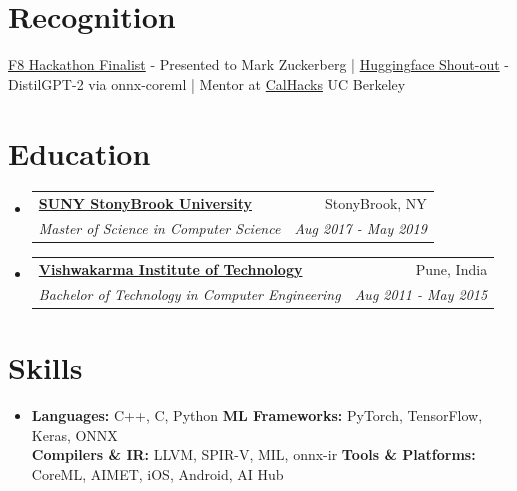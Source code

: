 \documentclass[letterpaper,10pt]{article}
\makeatletter
\newcommand{\resumeSubheading}[4]{
  \vspace{-1pt}\item
    \begin{tabular*}{0.97\textwidth}{l@{\extracolsep{\fill}}r}
      \textbf{#1} & #2 \\
      \textit{\small#3} & \textit{\small #4} \\
    \end{tabular*}\vspace{-5pt}
}
\newcommand{\resumeSubHeadingListStart}{\begin{itemize}[leftmargin=*]}
\newcommand{\resumeSubHeadingListEnd}{\end{itemize}}
\makeatother
\begin{document}
\section{Recognition}
\vspace{-2pt}
\footnotesize
\href{https://devpost.com/software/opencurriculum-by-wattba}{F8 Hackathon Finalist} - Presented to Mark Zuckerberg |
\href{https://x.com/julien_c/status/1181629761761755137}{Huggingface Shout-out} - DistilGPT-2 via onnx-coreml |
Mentor at \href{https://calhacks.io/}{CalHacks} UC Berkeley
\normalsize

\section{Education}
\resumeSubHeadingListStart
    \resumeSubheading
      {\href{http://www.stonybrook.edu/}{SUNY StonyBrook University}}{StonyBrook, NY}
      {Master of Science in Computer Science}{Aug 2017 - May 2019}
    \resumeSubheading
      {\href{http://vit.edu/}{Vishwakarma Institute of Technology}}{Pune, India}
      {Bachelor of Technology in Computer Engineering}{Aug 2011 - May 2015}
\resumeSubHeadingListEnd

\section{Skills}
  \resumeSubHeadingListStart
    \item\footnotesize{
      \textbf{Languages:} C++, C, Python \hfill
      \textbf{ML Frameworks:} PyTorch, TensorFlow, Keras, ONNX \\
      \textbf{Compilers \& IR:} LLVM, SPIR-V, MIL, onnx-ir \hfill
      \textbf{Tools \& Platforms:} CoreML, AIMET, iOS, Android, AI Hub
    }
  \resumeSubHeadingListEnd
\end{document}
